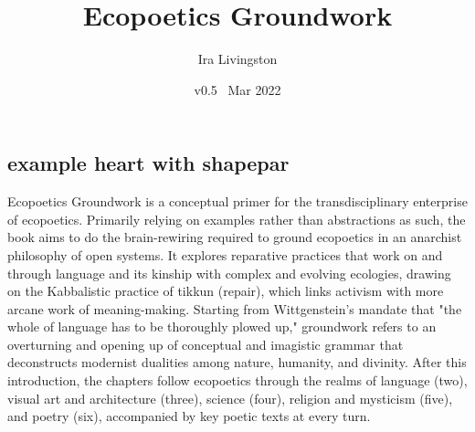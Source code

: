 \documentclass[draft]{article}
\title{Ecopoetics Groundwork}
\author{Ira Livingston}
\date{v0.5 \ Mar 2022}
\begin{document}
\maketitle
\subsection{example heart with shapepar}

\shapepar\heartshape
Ecopoetics Groundwork is a conceptual primer for the transdisciplinary enterprise of ecopoetics.  Primarily relying on examples rather than abstractions as such, the book aims to do the brain-rewiring required to ground ecopoetics in an anarchist philosophy of open systems.  It explores reparative practices that work on and through language and its kinship with complex and evolving ecologies, drawing on the Kabbalistic practice of tikkun (repair), which links activism with more arcane work of meaning-making.  Starting from Wittgenstein's mandate that "the whole of language has to be thoroughly plowed up," groundwork refers to an overturning and opening up of conceptual and imagistic grammar that deconstructs modernist dualities among nature, humanity, and divinity.  After this introduction, the chapters follow ecopoetics through the realms of language (two), visual art and architecture (three), science (four), religion and mysticism (five), and poetry (six), accompanied by key poetic texts at every turn.
\end{document}
